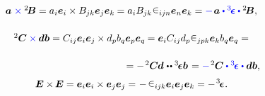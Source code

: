 \begin{otherlanguage}{russian}
\nopagebreak\vspace{-0.1em}\begin{equation*}
\begin{array}{c}
\bm{a} \hspace{.1ex} \mathcolor{blue}{\times} {^2\hspace{-0.16em}\bm{B}} = a_i \bm{e}_i \times B_{jk} \bm{e}_j \bm{e}_k \hspace{-0.1ex} = \tikzmark{BeginVectorCrossTensor} a_i B_{jk} \hspace{.1ex} \levicivita_{ijn} \tikzmark{EndVectorCrossTensor} \bm{e}_n \bm{e}_k = \mathcolor{blue}{-} \hspace{.2ex} \bm{a} \mathcolor{blue}{\dotp \levicivitatensor \dotp} {^2\!\bm{B}} ,
\\[1.6em]
%
{^2\hspace{-0.05ex}\bm{C}} \mathcolor{blue}{\times} \hspace{-0.1ex} \bm{d} \bm{b} = C_{ij} \bm{e}_i \bm{e}_j \hspace{-0.1ex} \times d_p b_q \bm{e}_p \bm{e}_q \hspace{-0.1ex} = \bm{e}_i C_{ij} d_p \tikzmark{BeginTensorCrossTensor} \levicivita_{jpk} \tikzmark{EndTensorCrossTensor} \bm{e}_k b_q \bm{e}_q =
\\[1.6em]
\hspace{12.5em} =
- \hspace{.2ex} {^2\hspace{-0.05ex}\bm{C}} \hspace{-0.1ex} \bm{d} \hspace{0.12ex} \dotdotp \levicivitatensor \bm{b} \hspace{0.2ex} =
\mathcolor{blue}{-} \hspace{.2ex} {^2\hspace{-0.05ex}\bm{C}} \mathcolor{blue}{\dotp \levicivitatensor \dotp} \bm{d} \bm{b},\\
\end{array}
\end{equation*}%
%
%
%
\vspace{-0.32em}\begin{equation}\label{iso:twothree}
\bm{E} \times \hspace{-0.16ex} \bm{E} = \bm{e}_i \bm{e}_i \times \bm{e}_j \bm{e}_j = \hspace{-0.4ex} \tikzmark{BeginECrossE} - \hspace{-0.2ex} \levicivita_{ijk} \bm{e}_i \bm{e}_j \bm{e}_k \tikzmark{EndECrossE} = - \hspace{.2ex} \levicivitatensor \hspace{0.1ex}.
\end{equation}
%


\end{otherlanguage}
